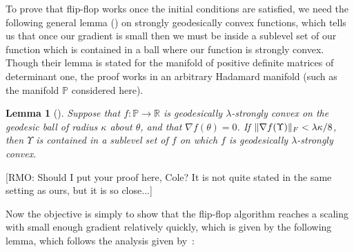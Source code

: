 \documentclass[aos]{imsart}
\newtheorem{lemma}[theorem]{Lemma}
\theoremstyle{definition}
\numberwithin{equation}{section}
\DeclarePairedDelimiter{\norm}{\lVert}{\rVert}
\newcommand{\R}{{\mathbb{R}}}
\newcommand{\SPD}{\mathbb{P}}
\newcommand{\RMO}[1]{{\color{red}[RMO: #1]}}
\begin{document}
To prove that flip-flop works once the initial conditions are satisfied, we need the following general lemma (\cite[Lemma 4.7]{FM20}) on strongly geodesically convex functions, which tells us that once our gradient is small then we must be inside a sublevel set of our function which is contained in a ball where our function is strongly convex. Though their lemma is stated for the manifold of positive definite matrices of determinant one, the proof works in an arbitrary Hadamard manifold (such as the manifold $\SPD$ considered here).

\begin{lemma}[\cite{FM20}]\label{lem:gradient-strong-convexity-fm}
Suppose that $f : \SPD \to \R$ is geodesically $\lambda$-strongly convex on the geodesic ball of radius $\kappa$ about $\theta$, and that $\nabla f(\theta) = 0$. 
If $\norm{\nabla f(\Upsilon)}_F < \lambda \kappa/8$, then $\Upsilon$ is contained in a sublevel set of $f$ on which $f$ is geodesically $\lambda$-strongly convex.
\end{lemma}

\RMO{Should I put your proof here, Cole? It is not quite stated in the same setting as ours, but it is so close...}

Now the objective is simply to show that the flip-flop algorithm reaches a scaling with small enough gradient relatively quickly, which is given by the following lemma, which follows the analysis given by~\cite{GGOW19}:
\end{document}
